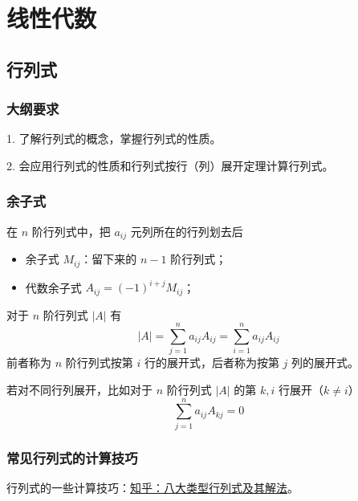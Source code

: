 \chapter{线性代数}

\newcommand{\transpose}[1]{{#1}^\mathsf{T}}

\section{行列式}

\subsection{大纲要求}

1. 了解行列式的概念，掌握行列式的性质。

2. 会应用行列式的性质和行列式按行（列）展开定理计算行列式。

\subsection{余子式}

在 $n$ 阶行列式中，把 $a_{ij}$ 元列所在的行列划去后
\begin{itemize}
	\item 余子式 $M_{ij}$：留下来的 $n-1$ 阶行列式；
	\item 代数余子式 $A_{ij} = (-1)^{i+j} M_{ij}$；
\end{itemize}

\begin{theorem}
	对于 $n$ 阶行列式 $|A|$ 有
	\[|A| = \sum_{j=1}^na_{ij}A_{ij} = \sum_{i=1}^na_{ij}A_{ij}\]
	前者称为 $n$ 阶行列式按第 $i$ 行的展开式，后者称为按第 $j$ 列的展开式。
\end{theorem}

若对不同行列展开，比如对于 $n$ 阶行列式 $|A|$ 的第 $k, i$ 行展开（$k \neq i$）
\[\sum_{j=1}^na_{ij}A_{kj} = 0 \]


\subsection{常见行列式的计算技巧}

行列式的一些计算技巧：\href{https://zhuanlan.zhihu.com/p/34685081}{知乎：八大类型行列式及其解法}。

